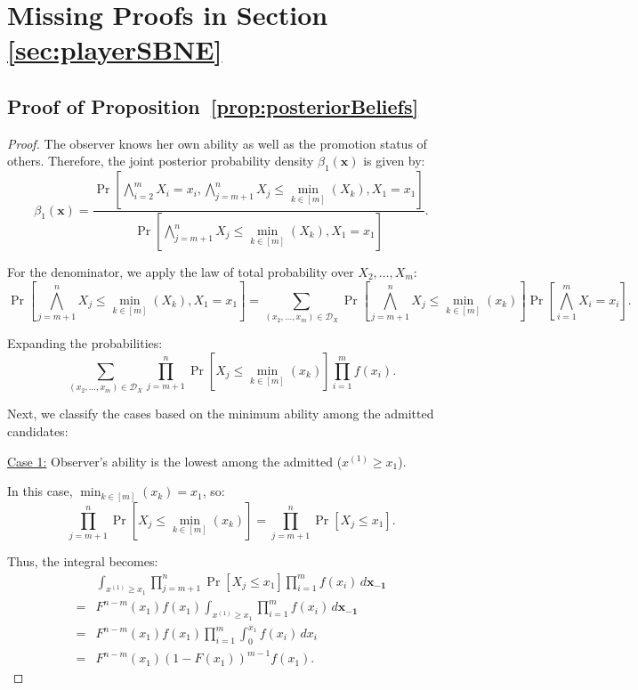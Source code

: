 \newpage
\section{Missing Proofs in Section \ref{sec:playerSBNE}}

\subsection*{Proof of Proposition~\ref{prop:posteriorBeliefs}}
\begin{proof}%
The observer knows her own ability as well as the promotion status of others. Therefore, the joint posterior probability density \(\beta_1(\mathbf{x})\) is given by:
\[
\beta_1(\mathbf{x}) = \frac{\Pr\left[ \bigwedge_{i=2}^{m} X_i = x_i, \bigwedge_{j=m+1}^{n} X_j \leq \min_{k \in [m]}(X_k), X_1 = x_1 \right]}{\Pr\left[ \bigwedge_{j=m+1}^{n} X_j \leq \min_{k \in [m]}(X_k), X_1 = x_1 \right]}.
\]

For the denominator, we apply the law of total probability over \(X_2, \dots, X_m\):
\[
\Pr\left[ \bigwedge_{j=m+1}^n X_j \leq \min_{k \in [m]}(X_k), X_1 = x_1 \right] =
\sum_{(x_2, \dots, x_m) \in \mathcal{D}_X} \Pr\left[ \bigwedge_{j=m+1}^n X_j \leq \min_{k \in [m]}(x_k) \right] \Pr\left[ \bigwedge_{i=1}^m X_i = x_i \right].
\]

Expanding the probabilities:
\[
\sum_{(x_2, \dots, x_m) \in \mathcal{D}_X} \prod_{j=m+1}^n \Pr\left[X_j \leq \min_{k \in [m]}(x_k)\right] \prod_{i=1}^m f(x_i).
\]

Next, we classify the cases based on the minimum ability among the admitted candidates:

\underline{Case 1:} Observer's ability is the lowest among the admitted (\(x^{(1)} \geq x_1\)).

In this case, \(\min_{k \in [m]}(x_k) = x_1\), so:
\[
\prod_{j=m+1}^n \Pr\left[X_j \leq \min_{k \in [m]}(x_k)\right] = \prod_{j=m+1}^n \Pr\left[X_j \leq x_1\right].
\]

Thus, the integral becomes:
\[
\begin{aligned}
& \int_{x^{(1)} \geq x_1} \prod_{j=m+1}^n \Pr\left[X_j \leq x_1\right] \prod_{i=1}^m f(x_i) \, d\mathbf{x_{-1}} \\
= & F^{n-m}(x_1) f(x_1) \int_{x^{(1)} \geq x_1} \prod_{i=1}^m f(x_i) \, d\mathbf{x_{-1}} \\
= & F^{n-m}(x_1) f(x_1) \prod_{i=1}^m \int_{0}^{x_1} f(x_i) \, dx_i \\
= & F^{n-m}(x_1) (1 - F(x_1))^{m-1} f(x_1).
\end{aligned}
\]


\end{proof}
